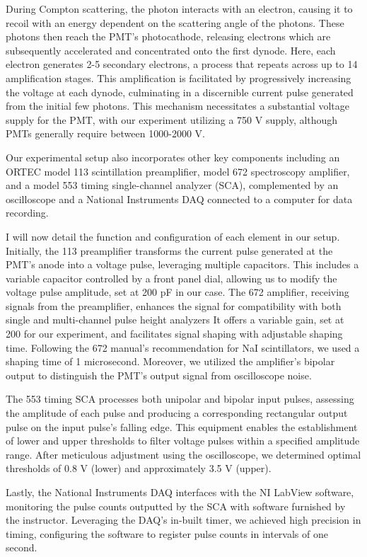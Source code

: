 \documentclass[10pt,letterpaper,onecolumn]{article}
\begin{document}
During Compton scattering, the photon interacts with an electron, causing it to 
recoil with an energy dependent on the scattering angle of the photons. 
These photons then reach the PMT's photocathode, releasing electrons which are 
subsequently accelerated and concentrated onto the first dynode. Here, each electron
 generates 2-5 secondary electrons, a process that repeats across up to 14 amplification 
 stages. This amplification is facilitated by progressively increasing the voltage at
  each dynode, culminating in a discernible current pulse generated from the initial 
  few photons. This mechanism necessitates a substantial voltage supply for the PMT,
   with our experiment utilizing a 750 V supply, although PMTs generally require 
   between 1000-2000 V.

Our experimental setup also incorporates other key components including an ORTEC 
model 113 scintillation preamplifier, model 672 spectroscopy amplifier, and a model 
553 timing single-channel analyzer (SCA), complemented by an oscilloscope and a
 National Instruments DAQ connected to a computer for data recording.

I will now detail the function and configuration of each element in our setup. 
Initially, the 113 preamplifier transforms the current pulse generated at the PMT's 
anode into a voltage pulse, leveraging multiple capacitors. 
This includes a variable capacitor controlled by a front panel dial, allowing us to 
modify the voltage pulse amplitude, set at 200 pF in our case. The 672 amplifier, 
receiving signals from the preamplifier, enhances the signal for compatibility with 
both single and multi-channel pulse height analyzers It offers a variable gain, set at 
200 for our experiment, and facilitates signal shaping with adjustable shaping time. 
Following the 672 manual's recommendation for NaI scintillators, we used a shaping 
time of 1 microsecond. Moreover, we utilized the amplifier's bipolar output to distinguish 
the PMT's output signal from oscilloscope noise.

The 553 timing SCA processes both unipolar and bipolar input pulses, assessing the
amplitude of each pulse and producing a corresponding rectangular output pulse on the 
input pulse's falling edge. This equipment enables the establishment of lower and upper 
thresholds to filter voltage pulses within a specified amplitude range. After meticulous 
adjustment using the oscilloscope, we determined optimal thresholds of 0.8 V (lower) and
approximately 3.5 V (upper).

Lastly, the National Instruments DAQ interfaces with the NI LabView software, 
monitoring the pulse counts outputted by the SCA with software furnished by the 
instructor. Leveraging the DAQ's in-built timer, we achieved high precision in timing, 
configuring the software to register pulse counts in intervals of one second.
\end{document}
